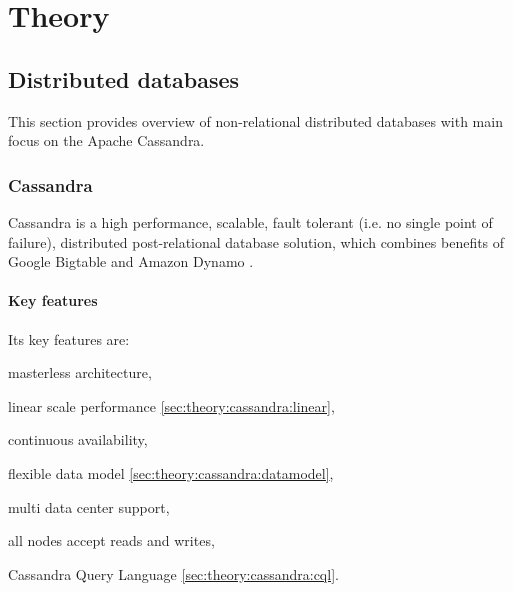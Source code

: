 
\chapter{Theory}\label{chapter:theory}

\section{Distributed databases}\label{sec:theory:distDbs}
This section provides overview of non-relational distributed databases with main focus on the Apache Cassandra.


\subsection{Cassandra}
Cassandra \cite{CassandraApacheDocs} \cite{CassandraDataStaxDocs} is a high performance, scalable, fault tolerant (i.e. no single point of failure), distributed post-relational database solution, which combines benefits of Google Bigtable \cite{chang2008bigtable} and Amazon Dynamo \cite{decandia2007dynamo}.


\subsubsection{Key features}
Its key features are:
\begin{enumerate*}
\item masterless architecture,
\item linear scale performance \ref{sec:theory:cassandra:linear},
\item continuous availability,
\item flexible data model \ref{sec:theory:cassandra:datamodel},
\item multi data center support,
\item all nodes accept reads and writes,
\item Cassandra Query Language \ref{sec:theory:cassandra:cql}.
\end{enumerate*}

